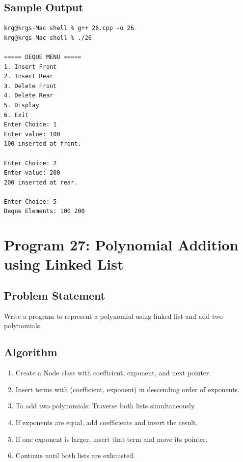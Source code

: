 \documentclass[a4paper,12pt]{article}
\begin{document}
\subsection*{Sample Output}
\begin{lstlisting}[style=outputstyle]
krg@krgs-Mac shell % g++ 26.cpp -o 26
krg@krgs-Mac shell % ./26

===== DEQUE MENU =====
1. Insert Front
2. Insert Rear
3. Delete Front
4. Delete Rear
5. Display
6. Exit
Enter Choice: 1
Enter value: 100
100 inserted at front.

Enter Choice: 2
Enter value: 200
200 inserted at rear.

Enter Choice: 5
Deque Elements: 100 200 
\end{lstlisting}

\newpage

\section*{Program 27: Polynomial Addition using Linked List}

\subsection*{Problem Statement}
Write a program to represent a polynomial using linked list and add two polynomials.

\subsection*{Algorithm}
\begin{enumerate}
    \item Create a Node class with coefficient, exponent, and next pointer.
    \item Insert terms with (coefficient, exponent) in descending order of exponents.
    \item To add two polynomials: Traverse both lists simultaneously.
    \item If exponents are equal, add coefficients and insert the result.
    \item If one exponent is larger, insert that term and move its pointer.
    \item Continue until both lists are exhausted.
\end{enumerate}
\end{document}
